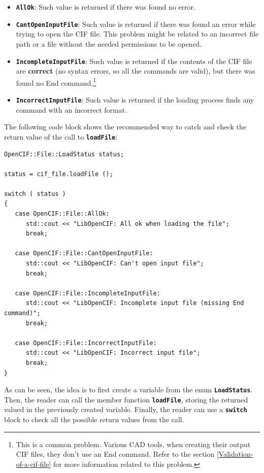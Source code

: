 \documentclass[11pt,twoside,openany,x11names,svgnames]{memoir}
\begin{document}
\begin{itemize}
	\item \textbf{\texttt{AllOk}}: Such value is returned if there was found no error.
	
	\item \textbf{\texttt{CantOpenInputFile}}: Such value is returned if there was found an error while trying to open the CIF file. This problem might be related to an incorrect file path or a file without the needed permissions to be opened.
	
	\item \textbf{\texttt{IncompleteInputFile}}: Such value is returned if the contents of the CIF file are \textbf{correct} (no syntax errors, so all the commands are valid), but there was found no End command.\footnote{This is a common problem. Various CAD tools, when creating their output CIF files, they don't use an End command. Refer to the section \ref{Validation-of-a-cif-file} for more information related to this problem.}
	
	\item \textbf{\texttt{IncorrectInputFile}}: Such value is returned if the loading process finds any command with an incorrect format.
\end{itemize}

The following code block shows the recommended way to catch and check the return value of the call to \textbf{\texttt{loadFile}}:

\begin{lstlisting}[frame=single,style=CPPStyle]
OpenCIF::File::LoadStatus status;
   
status = cif_file.loadFile ();
   
switch ( status )
{
   case OpenCIF::File::AllOk:
      std::cout << "LibOpenCIF: All ok when loading the file";
      break;
         
   case OpenCIF::File::CantOpenInputFile:
      std::cout << "LibOpenCIF: Can't open input file";
      break;
         
   case OpenCIF::File::IncompleteInputFile:
      std::cout << "LibOpenCIF: Incomplete input file (missing End command)";
      break;
         
   case OpenCIF::File::IncorrectInputFile:
      std::cout << "LibOpenCIF: Incorrect input file";
      break;
}
\end{lstlisting}

As can be seen, the idea is to first create a variable from the enum \textbf{\texttt{LoadStatus}}. Then, the reader can call the member function \textbf{\texttt{loadFile}}, storing the returned valued in the previously created variable. Finally, the reader can use a \textbf{\texttt{switch}} block to check all the possible return values from the call.
\end{document}
